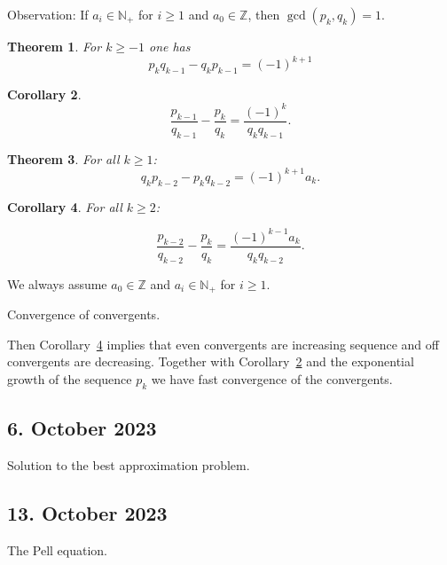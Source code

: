\documentclass[a4paper,11pt,american]{article}
\theoremstyle{plain}
\newtheorem{theorem}{Theorem}
\newtheorem{corollary}[theorem]{Corollary}
\theoremstyle{definition}
\begin{document}
Observation: If $a_i ∈ℕ_+$ for $i≥1$ and $a_0 ∈ℤ$, then $\gcd(p_k,q_k) = 1$.


\begin{theorem}
  \label{thr:3}
  For $k≥ -1$ one has
  \begin{displaymath}
    p_k q_{k-1} - q_k p_{k-1} = (-1)^{k+1} 
  \end{displaymath}
\end{theorem}

\begin{corollary}
  \label{co:1}
  \begin{equation}
    \label{eq:4}
      \frac{p_{k-1}}{q_{k-1}} - \frac{p_k}{q_k} = \frac{(-1)^k }{q_k q_{k-1}}.    
  \end{equation}

\end{corollary}

\begin{theorem}
  For all $k≥1$:
  \begin{displaymath}
    q_k p_{k-2} - p_k q_{k-2} = (-1)^ {k+1} a_k. 
  \end{displaymath}
\end{theorem}


\begin{corollary}
  \label{co:2}
  For all $k≥ 2$:

  \begin{displaymath}
    \frac{p_{k-2}}{q_{k-2}} -    \frac{p_k}{q_k} = \frac{(-1)^{k-1} a_k}{q_k q_{k-2}}. 
  \end{displaymath}
\end{corollary}

We always assume $a_0∈ℤ$ and $a_i ∈ ℕ_+$ for $i≥1$.





Convergence of convergents.  

Then Corollary~\ref{co:2} implies that even convergents are increasing sequence and off convergents are decreasing. Together with Corollary~\ref{co:1} and the exponential growth of the sequence $p_k$ we have fast convergence of the convergents.



\subsection*{6. October 2023}
Solution to the best approximation problem.

\subsection*{13. October 2023}

The Pell equation. 



\end{document}
